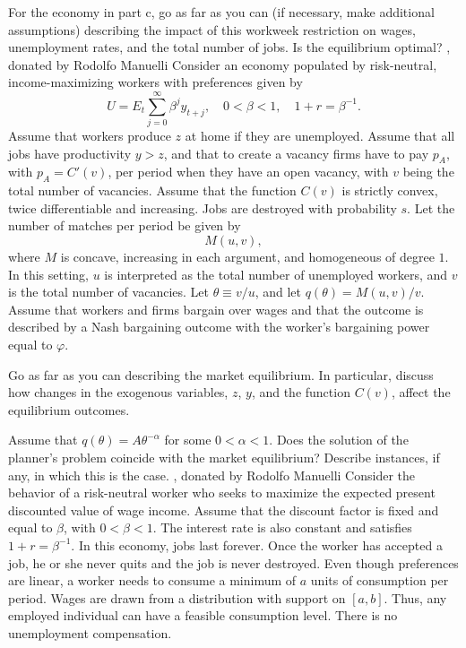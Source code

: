  For the economy in part c, go as far as you can (if necessary, make
additional assumptions) describing the impact of this workweek restriction on wages,
unemployment rates, and the total number of jobs.  Is the equilibrium optimal?
\medskip
{} , donated by Rodolfo Manuelli
\medskip \noindent
Consider an economy populated by risk-neutral, income-maximizing workers with
preferences given by
$$ U = E_t \sum_{j=0}^\infty \beta^j y_{t+j}, \quad
0 < \beta < 1, \quad
1 + r = \beta^{-1}.  $$
Assume that workers produce $z$ at home if they are unemployed.  Assume that
 all jobs have productivity $y>z$, and that to create a vacancy firms
have to pay $p_A$, with $p_A = C'(v)$, per period when they have an open
 vacancy, with $v$ being the total number of vacancies.  Assume that the
function $C(v)$ is strictly convex, twice differentiable and increasing.
  Jobs are destroyed with probability $s$.
\medskip
\noindent
Let the number of matches per period be given by
$$ M(u,v),  $$
where $M$ is concave, increasing in each argument, and homogeneous
 of degree $1$.  In this setting, $u$ is interpreted as the total
number of unemployed workers, and $v$ is the total number of vacancies.
Let $\theta \equiv v/u$, and let $q(\theta) = M(u,v)/v$.
\medskip
\noindent
Assume that workers and firms bargain over wages and that the outcome is
described by a Nash bargaining outcome with the worker's bargaining power
equal to $\varphi$.
\medskip

 Go as far as you can describing the market equilibrium.
In particular, discuss how changes in the exogenous variables, $z$, $y$, and
the function $C(v)$, affect the equilibrium outcomes.
\medskip

 Assume that $q(\theta) = A \theta^{-\alpha}$ for some  $0 < \alpha < 1$.
Does the solution of the planner's problem coincide with  the market equilibrium?
Describe instances, if any, in which this is the case.
\vfil\eject
\medskip
{} , donated by Rodolfo Manuelli
\medskip \noindent
Consider the behavior of a risk-neutral worker who seeks to maximize the expected
present discounted value of wage income.  Assume that the discount factor is fixed
and equal to $\beta$, with $0<\beta<1$.  The interest rate is also constant and
satisfies $1+r=\beta^{-1}$.  In this economy, jobs last  forever.  Once the worker
has accepted a job, he or she never quits and the job is never destroyed.  Even though
preferences are linear, a worker needs to consume a minimum of $a$ units of
consumption per period.  Wages are drawn from a distribution with support
on $[a,b]$.  Thus, any employed individual can have a feasible consumption
level.  There is no unemployment compensation.

